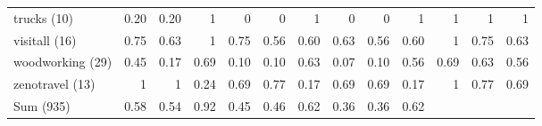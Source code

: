 \begin{tabular}{l|rrr|rrr|rrr|rrr}
		trucks (10) & 0.20 & 0.20 & 1 & 0 & 0 & 1 & 0 & 0 & 1 & 1 & 1 & 1\\
		visitall (16) & 0.75 & 0.63 & 1 & 0.75 & 0.56 & 0.60 & 0.63 & 0.56 & 0.60 & 1 & 0.75 & 0.63\\
		woodworking (29) & 0.45 & 0.17 & 0.69 & 0.10 & 0.10 & 0.63 & 0.07 & 0.10 & 0.56 & 0.69 & 0.63 & 0.56\\
		zenotravel (13) & 1 & 1 & 0.24 & 0.69 & 0.77 & 0.17 & 0.69 & 0.69 & 0.17 & 1 & 0.77 & 0.69\\\hline
		Sum (935) & 0.58 & 0.54 & 0.92 & 0.45 & 0.46 & 0.62 & 0.36 & 0.36 & 0.62 &  &  & \\
	\end{tabular}

